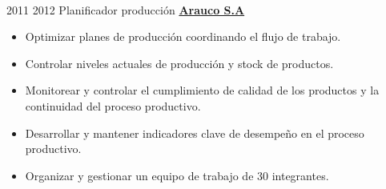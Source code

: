 \documentclass[letterpaper]{DS_class_file} %
\begin{document}
\begin{twenty}
{\begin{itemize}
		\end{itemize}}
		\\
	\twentyitem
		{2011}
		{2012}
		{\hspace{0.3cm}Planificador producción}
		{\href{https://www.arauco.cl/chile/}{\textbf{Arauco S.A}}}
		{}
		{\begin{itemize}
			\item Optimizar planes de producción coordinando el flujo de trabajo.
			\item Controlar niveles actuales de producción y stock de productos.
			\item Monitorear y controlar el cumplimiento de calidad de los productos y la continuidad del proceso productivo. 
			\item Desarrollar y mantener indicadores clave de desempeño en el proceso productivo. 
			\item Organizar y gestionar un equipo de trabajo de 30 integrantes.
		\end{itemize}}
\end{twenty}

%
%
\end{document}
